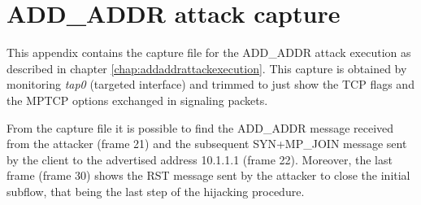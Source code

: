 \chapter{ADD\_ADDR attack capture}
\label{app:a}

This appendix contains the capture file for the ADD\_ADDR attack execution as described in chapter \ref{chap:addaddrattackexecution}. This capture is obtained by monitoring \textit{tap0} (targeted interface) and trimmed to just show the TCP flags and the MPTCP options exchanged in signaling packets.

From the capture file it is possible to find the ADD\_ADDR message received from the attacker (frame 21) and the subsequent SYN+MP\_JOIN message sent by the client to the advertised address 10.1.1.1 (frame 22). Moreover, the last frame (frame 30) shows the RST message sent by the attacker to close the initial subflow, that being the last step of the hijacking procedure.

